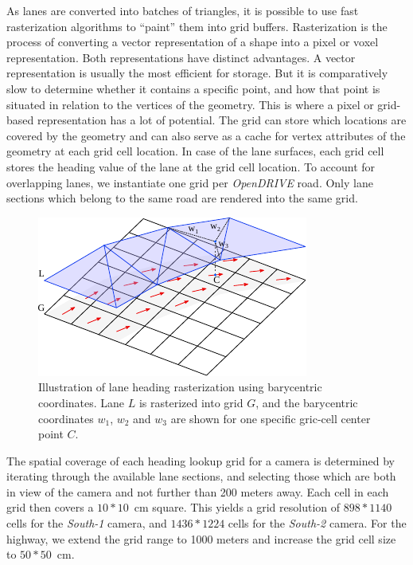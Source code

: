 As lanes are converted into batches of triangles, it is possible to use fast rasterization algorithms to \enquote{paint} them into grid buffers.
Rasterization is the process of converting a vector representation of a shape into a pixel or voxel representation.
Both representations have distinct advantages.
A vector representation is usually the most efficient for storage.
But it is comparatively slow to determine whether it contains a specific point, and how that point is situated in relation to the vertices of the geometry.
This is where a pixel or grid-based representation has a lot of potential.
The grid can store which locations are covered by the geometry and can also serve as a cache for vertex attributes of the geometry at each grid cell location.
In case of the lane surfaces, each grid cell stores the heading value of the lane at the grid cell location.
To account for overlapping lanes, we instantiate one grid per \textit{OpenDRIVE} road.
Only lane sections which belong to the same road are rendered into the same grid.

\begin{figure}[htb]
    \centering
    \includegraphics[width=0.7\linewidth]{figures/rasterization}
    \caption{Illustration of lane heading rasterization using barycentric coordinates. Lane $L$ is rasterized into grid $G$, and the barycentric coordinates $w_1$, $w_2$ and $w_3$ are shown for one specific gric-cell center point $C$.}
    \label{fig:rasterization}
\end{figure}

The spatial coverage of each heading lookup grid for a camera is determined by iterating through the available lane sections, and selecting those which are both in view of the camera and not further than 200 meters away.
Each cell in each grid then covers a $10*10$~cm square.
This yields a grid resolution of $898*1140$ cells for the \textit{South-1} camera, and $1436*1224$ cells for the \textit{South-2} camera.
For the highway, we extend the grid range to 1000 meters and increase the grid cell size to $50*50$~cm.

